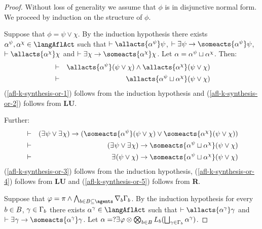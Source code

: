 \begin{proof}
Without loss of generality we assume that $\phi$ is in disjunctive normal form.
We proceed by induction on the structure of $\phi$.

Suppose that $\phi = \psi \lor \chi$.
By the induction hypothesis there exists $\alpha^\psi, \alpha^\chi \in \langAflAct$ such that $\proves \allacts{\alpha^\psi} \psi$, $\proves \somerefs \psi \implies \someacts{\alpha^\psi} \psi$, $\proves \allacts{\alpha^\chi} \chi$ and $\proves \somerefs \chi \implies \someacts{\alpha^\chi} \chi$.
Let $\alpha = \alpha^\psi \sqcup \alpha^\chi$.
Then:
\begin{eqnarray}
    &\proves& \allacts{\alpha^\psi} (\psi \lor \chi) \land \allacts{\alpha^\chi} (\psi \lor \chi)\label{afl-k-synthesis-or-1}\\
    &\proves& \allacts{\alpha^\psi \choice \alpha^\chi} (\psi \lor \chi)\label{afl-k-synthesis-or-2}
\end{eqnarray}
(\ref{afl-k-synthesis-or-1}) follows from the induction hypothesis and
(\ref{afl-k-synthesis-or-2}) follows from {\bf LU}.

Further:
\begin{eqnarray}
    &\proves& (\somerefs \psi \lor \somerefs \chi) \implies (\someacts{\alpha^\psi} (\psi \lor \chi) \lor \someacts{\alpha^\chi} (\psi \lor \chi))\label{afl-k-synthesis-or-3}\\
    &\proves& (\somerefs \psi \lor \somerefs \chi) \implies \someacts{\alpha^\psi \choice \alpha^\chi} (\psi \lor \chi)\label{afl-k-synthesis-or-4}\\
    &\proves& \somerefs (\psi \lor \chi) \implies \someacts{\alpha^\psi \choice \alpha^\chi} (\psi \lor \chi)\label{afl-k-synthesis-or-5}
\end{eqnarray}
(\ref{afl-k-synthesis-or-3}) follows from the induction hypothesis,
(\ref{afl-k-synthesis-or-4}) follows from {\bf LU} and
(\ref{afl-k-synthesis-or-5}) follows from {\bf R}.

Suppose that $\phi = \pi \land \bigwedge_{\agentB \in \agentsB \subseteq \agents} \coversB \Gamma_\agentB$.
By the induction hypothesis for every $b \in B$, $\gamma \in \Gamma_b$ there exists $\alpha^\gamma \in \langAflAct$ such that $\proves \allacts{\alpha^\gamma} \gamma$ and $\proves \somerefs \gamma \implies \someacts{\alpha^\gamma} \gamma$.
Let $\alpha = \test{\somerefs \phi} \compose \bigcompose_{\agentB \in \agentsB} \learns_\agentB (\bigchoice_{\gamma \in \Gamma_\agentB} \alpha^\gamma)$.


\end{proof}
